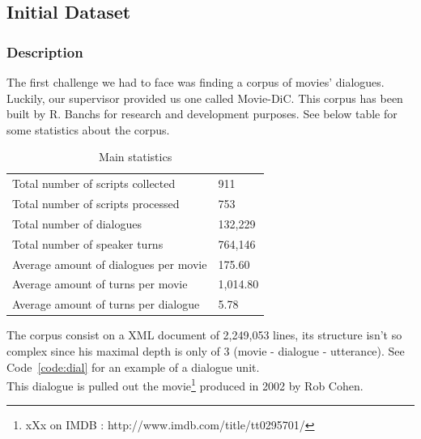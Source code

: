 \subsection{Initial Dataset}
\subsubsection{Description}
The first challenge we had to face was finding a corpus of movies' dialogues. Luckily, our supervisor provided us one called Movie-DiC. This corpus has been built by R. Banchs \cite{banchs} for research and development purposes. See below table for some statistics about the corpus.\\
\begin{table}[h!]
\centering
\label{tablestats}
\begin{tabular}{ll}
Total number of scripts collected & 911 \\
Total number of scripts processed & 753 \\
Total number of dialogues & 132,229 \\
Total number of speaker turns & 764,146 \\
Average amount of dialogues per movie & 175.60 \\
Average amount of turns per movie & 1,014.80 \\
Average amount of turns per dialogue & 5.78 
\end{tabular}
\caption{Main statistics}
\end{table}

The corpus consist on a XML document of 2,249,053 lines, its structure isn't so complex since his maximal depth is only of 3 (movie - dialogue - utterance). See Code~\ref{code:dial} for an example of a dialogue unit.\\

This dialogue is pulled out the  movie\footnote{xXx on IMDB : http://www.imdb.com/title/tt0295701/} produced in 2002 by Rob Cohen.
